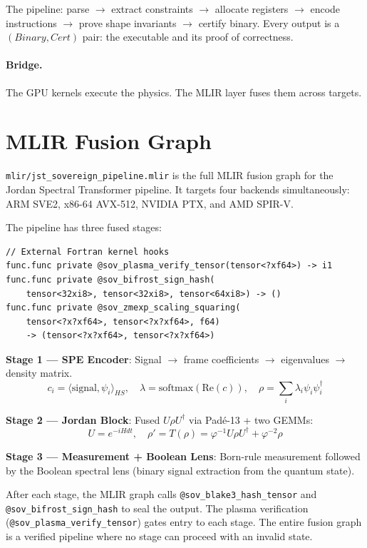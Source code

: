 \documentclass[11pt,a4paper]{article}
\begin{document}
The pipeline: parse $\to$ extract constraints $\to$ allocate registers
$\to$ encode instructions $\to$ prove shape invariants $\to$ certify
binary. Every output is a $(Binary, Cert)$ pair: the executable and its
proof of correctness.

\paragraph{Bridge.} The GPU kernels execute the physics. The MLIR layer
fuses them across targets.

\section{MLIR Fusion Graph}

\texttt{mlir/jst\_sovereign\_pipeline.mlir} is the full MLIR fusion graph
for the Jordan Spectral Transformer pipeline. It targets four backends
simultaneously: ARM SVE2, x86-64 AVX-512, NVIDIA PTX, and AMD SPIR-V.

The pipeline has three fused stages:

\begin{lstlisting}[language={}]
// External Fortran kernel hooks
func.func private @sov_plasma_verify_tensor(tensor<?xf64>) -> i1
func.func private @sov_bifrost_sign_hash(
    tensor<32xi8>, tensor<32xi8>, tensor<64xi8>) -> ()
func.func private @sov_zmexp_scaling_squaring(
    tensor<?x?xf64>, tensor<?x?xf64>, f64)
    -> (tensor<?x?xf64>, tensor<?x?xf64>)
\end{lstlisting}

\textbf{Stage 1 --- SPE Encoder}: Signal $\to$ frame coefficients $\to$
eigenvalues $\to$ density matrix.
\[
c_i = \langle \text{signal}, \psi_i \rangle_{HS}, \quad
\lambda = \text{softmax}(\mathrm{Re}(c)), \quad
\rho = \sum_i \lambda_i \psi_i \psi_i^\dagger
\]

\textbf{Stage 2 --- Jordan Block}: Fused $U \rho U^\dagger$ via
Pad\'e-13 + two GEMMs:
\[
U = e^{-iHdt}, \quad \rho' = T(\rho) = \varphi^{-1} U\rho U^\dagger +
\varphi^{-2} \rho
\]

\textbf{Stage 3 --- Measurement + Boolean Lens}: Born-rule measurement
followed by the Boolean spectral lens (binary signal extraction from
the quantum state).

After each stage, the MLIR graph calls \texttt{@sov\_blake3\_hash\_tensor}
and \texttt{@sov\_bifrost\_sign\_hash} to seal the output. The plasma
verification (\texttt{@sov\_plasma\_verify\_tensor}) gates entry to each
stage. The entire fusion graph is a verified pipeline where no stage can
proceed with an invalid state.
\end{document}
